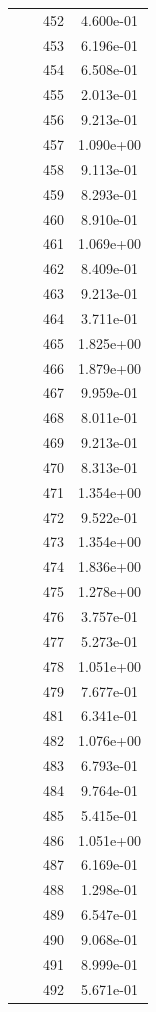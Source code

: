 \documentclass[12pt]{article}
\begin{document}
\begin{longtable}{@{}cccc@{}}
 &  & 452 & 4.600e-01 \\
 &  & 453 & 6.196e-01 \\
 &  & 454 & 6.508e-01 \\
 &  & 455 & 2.013e-01 \\
 &  & 456 & 9.213e-01 \\
 &  & 457 & 1.090e+00 \\
 &  & 458 & 9.113e-01 \\
 &  & 459 & 8.293e-01 \\
 &  & 460 & 8.910e-01 \\
 &  & 461 & 1.069e+00 \\
 &  & 462 & 8.409e-01 \\
 &  & 463 & 9.213e-01 \\
 &  & 464 & 3.711e-01 \\
 &  & 465 & 1.825e+00 \\
 &  & 466 & 1.879e+00 \\
 &  & 467 & 9.959e-01 \\
 &  & 468 & 8.011e-01 \\
 &  & 469 & 9.213e-01 \\
 &  & 470 & 8.313e-01 \\
 &  & 471 & 1.354e+00 \\
 &  & 472 & 9.522e-01 \\
 &  & 473 & 1.354e+00 \\
 &  & 474 & 1.836e+00 \\
 &  & 475 & 1.278e+00 \\
 &  & 476 & 3.757e-01 \\
 &  & 477 & 5.273e-01 \\
 &  & 478 & 1.051e+00 \\
 &  & 479 & 7.677e-01 \\
 &  & 481 & 6.341e-01 \\
 &  & 482 & 1.076e+00 \\
 &  & 483 & 6.793e-01 \\
 &  & 484 & 9.764e-01 \\
 &  & 485 & 5.415e-01 \\
 &  & 486 & 1.051e+00 \\
 &  & 487 & 6.169e-01 \\
 &  & 488 & 1.298e-01 \\
 &  & 489 & 6.547e-01 \\
 &  & 490 & 9.068e-01 \\
 &  & 491 & 8.999e-01 \\
 &  & 492 & 5.671e-01 \\

\end{longtable}
\end{document}
